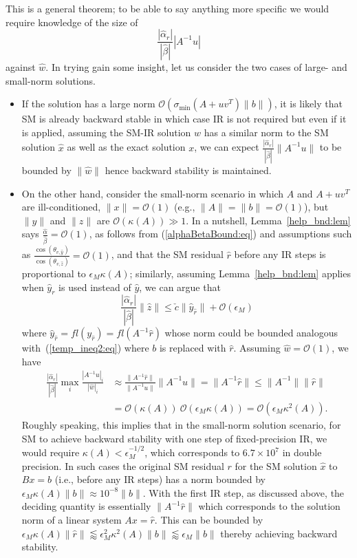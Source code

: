 \documentclass{siamltex}
\newcommand{\eqnref}[1]{(\ref{#1})}
\newcommand{\eps}{\epsilon}
\begin{document}
This is a general theorem; to be able to say anything more specific we would require knowledge of the size of 
\[
\frac{|\hat \alpha_r|}{|\hat \beta|}  |A^{-1} u|
\]
 against $\hat w$. In trying gain some insight, let us consider the two cases of large- and small-norm solutions. 
 \begin{itemize}
 \item If the solution has a large norm $\mathcal{O}(\sigma_{\min}(A+uv^T)\|b\|)$, it is likely that SM is already backward stable in which case IR is not required but even if it is applied, assuming the SM-IR solution $\hat w$ has a similar norm to the SM solution $\hat x$ as well as the exact solution $x$, we can expect $\frac{|\hat \alpha_r|}{|\hat \beta|}  \|A^{-1} u\|$ to be bounded by $\|\hat w\|$ hence backward stability is maintained. 
  \item On the other hand, consider the small-norm scenario in which $A$ and $A+uv^T$ are ill-conditioned, $\|x\| = \mathcal{O}(1)$ (e.g., $\|A\| = \|b\| = \mathcal{O}(1)$), but $\|y\|$ and $\|z\|$ are $\mathcal{O}(\kappa(A)) \gg 1$. In a nutshell, Lemma~\ref{help_bnd:lem} says $\frac{\hat \alpha}{\hat \beta} = \mathcal{O}(1)$, as follows from \eqnref{alphaBetaBound:eq} and assumptions such as $\frac{\cos (\theta_{v,\hat y})}{\cos (\theta_{v,\hat z})} = \mathcal{O}(1)$, and that the SM residual $\hat r$ before any IR steps is proportional to $\eps_M \kappa(A)$; similarly, assuming Lemma~\ref{help_bnd:lem} applies when $\hat y_r$ is used instead of $\hat y$, we can argue that 
 \[
 \frac{|\hat \alpha_r|}{|\hat \beta|} \|\hat z \| \leq \check c \| \hat{y}_{\hat r}\| + \mathcal{O}{(\eps_M)} 
 \]
where $\hat{y}_{\hat r} = fl(y_{\hat r}) = fl(A^{-1} \hat r)$ whose norm could be bounded analogous with~\eqnref{temp_ineq2:eq} where $b$ is replaced with $\hat r$. Assuming $\hat w = \mathcal{O}(1)$, we have 
 \begin{align*}
\frac{|\hat \alpha_r|}{|\hat \beta|} \max_i \frac{|A^{-1} u|_i}{|\hat w|_i} &\approx 
 \frac{\|A^{-1} \hat r\|}{\|A^{-1} u\|} \|A^{-1}u\|= \|A^{-1} \hat r\| \leq \|A^{-1}\| \| \hat r\| \\ & = \mathcal{O}(\kappa(A))\ \mathcal{O}(\eps_M \kappa(A)) = \mathcal{O}(\eps_M \kappa^2(A)).
 \end{align*}
Roughly speaking, this implies that in the small-norm solution scenario, for SM to achieve backward stability with one step of fixed-precision IR, we would require $\kappa(A) < \eps_M^{-1/2}$, which corresponds to $6.7 \times 10^7$ in double precision. In such cases the original SM residual $r$ for the SM solution $\hat x$ to $Bx=b$ (i.e., before any IR steps) has a norm bounded by $\eps_M \kappa(A) \|b\| \approx  10^{-8} \|b\|$. With the first IR step, as discussed above, the deciding quantity is essentially $\|A^{-1} \hat r\|$ which corresponds to the solution norm of a linear system $Ax = \hat r $. This can be bounded by $\eps_M \kappa(A) \| \hat r \| \lessapprox \eps_M^2 \kappa^2(A) \|b\| \lessapprox \eps_M \|b\|$ thereby achieving backward stability.
\end{itemize}
\end{document}
